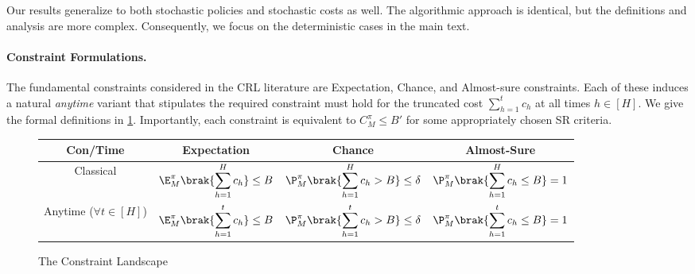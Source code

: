 \documentclass[pdftex, a4paper, 12pt]{article}
\newcommand{\jeremy}[1]{\textcolor{red}{#1}}
\begin{document}
\begin{remark}\label{remark: stochastic}
    Our results generalize to both stochastic policies and stochastic costs as well. The algorithmic approach is identical, but the definitions and analysis are more complex. Consequently, we focus on the deterministic cases in the main text.
\end{remark}


\paragraph{Constraint Formulations.} The fundamental constraints considered in the CRL literature are Expectation, Chance, and Almost-sure constraints. Each of these induces a natural \emph{anytime} variant that stipulates the required constraint must hold for the truncated cost $\sum_{h = 1}^t c_h$ at all times $h \in [H]$. We give the formal definitions in \cref{fig: constraints}. Importantly, each constraint is equivalent to $C^{\pi}_M \leq B'$ for some appropriately chosen SR criteria. 


\begin{figure}
    \centering
    \begin{tabular}{c | c | c | c}
    Con/Time & Expectation & Chance & Almost-Sure\\
    \hline
    Classical &  $\displaystyle\E^{\pi}_M\brak{\sum_{h = 1}^H c_h} \leq B$ & $\displaystyle\P^{\pi}_M\brak{\sum_{h = 1}^H c_h > B} \leq \delta$ & $\displaystyle\P^{\pi}_M\brak{\sum_{h = 1}^H c_h \leq B} = 1$\\
    \hline
    Anytime ($\forall t \in [H]$) & $\displaystyle\E^{\pi}_M\brak{\sum_{h = 1}^t c_h} \leq B$ & $\displaystyle\P^{\pi}_M\brak{\sum_{h = 1}^t c_h > B} \leq \delta$ & $\displaystyle\P^{\pi}_M\brak{\sum_{h = 1}^t c_h \leq B} = 1$
    \end{tabular}
    \caption{The Constraint Landscape}
    \label{fig: constraints}
\end{figure}
\end{document}
